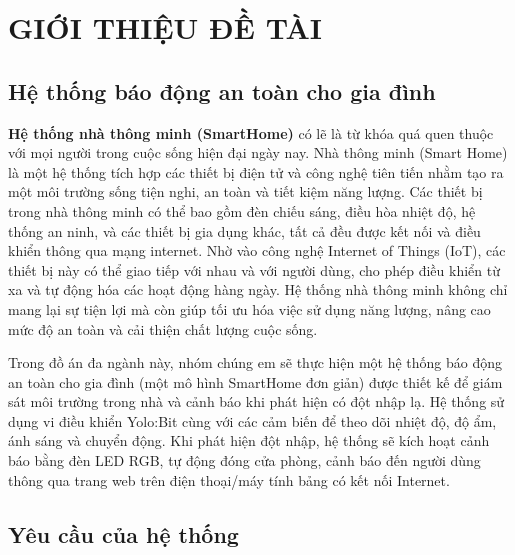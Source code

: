 \newpage
\section{GIỚI THIỆU ĐỀ TÀI}

\subsection{Hệ thống báo động an toàn cho gia đình}

\textbf{Hệ thống nhà thông minh (SmartHome)} có lẽ là từ khóa quá quen thuộc với mọi người trong cuộc sống hiện đại ngày nay. Nhà thông minh (Smart Home) là một hệ thống tích hợp các thiết bị điện tử và công nghệ tiên tiến nhằm tạo ra một môi trường sống tiện nghi, an toàn và tiết kiệm năng lượng. Các thiết bị trong nhà thông minh có thể bao gồm đèn chiếu sáng, điều hòa nhiệt độ, hệ thống an ninh, và các thiết bị gia dụng khác, tất cả đều được kết nối và điều khiển thông qua mạng internet. Nhờ vào công nghệ Internet of Things (IoT), các thiết bị này có thể giao tiếp với nhau và với người dùng, cho phép điều khiển từ xa và tự động hóa các hoạt động hàng ngày. Hệ thống nhà thông minh không chỉ mang lại sự tiện lợi mà còn giúp tối ưu hóa việc sử dụng năng lượng, nâng cao mức độ an toàn và cải thiện chất lượng cuộc sống.

Trong đồ án đa ngành này, nhóm chúng em sẽ thực hiện một hệ thống báo động an toàn cho gia đình (một mô hình SmartHome đơn giản) được thiết kế để giám sát môi trường trong nhà và cảnh báo khi phát hiện có đột nhập lạ. Hệ thống sử dụng vi điều khiển Yolo:Bit cùng với các cảm biến để theo dõi nhiệt độ, độ ẩm, ánh sáng và chuyển động. Khi phát hiện đột nhập, hệ thống sẽ kích hoạt cảnh báo bằng đèn LED RGB, tự động đóng cửa phòng, cảnh báo đến người dùng thông qua trang web trên điện thoại/máy tính bảng có kết nối Internet.


\subsection{Yêu cầu của hệ thống}

